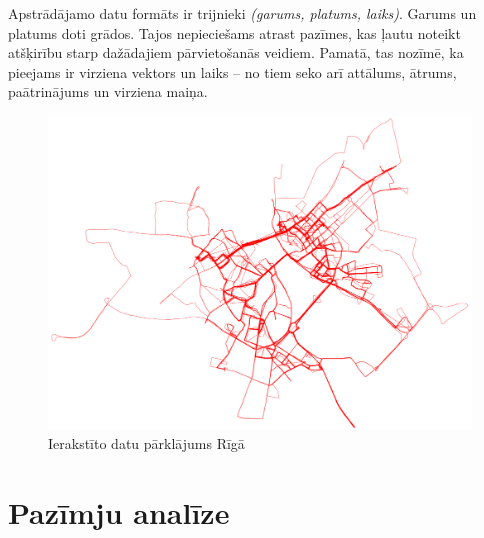 \documentclass{ludis}
\begin{document}
Apstrādājamo datu formāts ir trijnieki \emph{(garums, platums, laiks)}. Garums un platums doti 
grādos. Tajos nepieciešams atrast pazīmes, kas ļautu noteikt atšķirību starp dažādajiem 
pārvietošanās veidiem. Pamatā, tas nozīmē, ka pieejams ir virziena vektors un laiks -- no tiem
seko arī attālums, ātrums, paātrinājums un virziena maiņa.

\begin{figure}
  \centering
  \includegraphics[scale=0.5]{img/all_trails}
  \caption{Ierakstīto datu pārklājums Rīgā}
  \label{fig:all_trails}
\end{figure}

\section{Pazīmju analīze}


\end{document}
